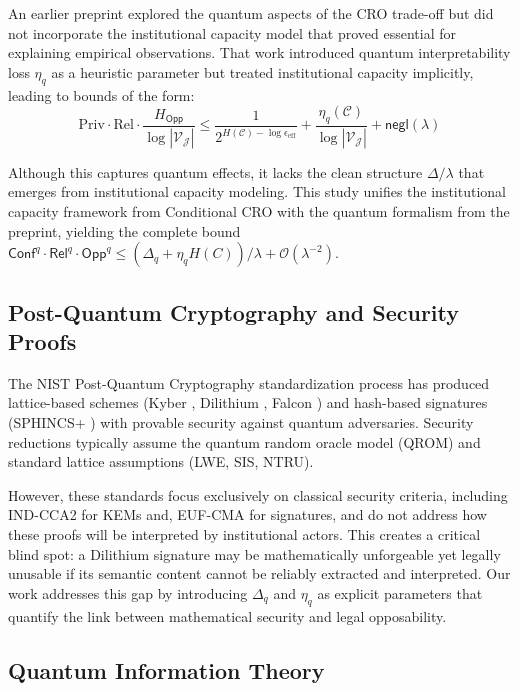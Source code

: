 \documentclass{ieeeaccess}
\newcommand{\Conf}{\mathsf{Conf}}
\newcommand{\Rel}{\mathsf{Rel}}
\newcommand{\Opp}{\mathsf{Opp}}
\begin{document}
An earlier preprint \cite{CRO2025} explored the quantum aspects of the CRO trade-off but did not incorporate the institutional capacity model that proved essential for explaining empirical observations. That work introduced quantum interpretability loss $\eta_q$ as a heuristic parameter but treated institutional capacity implicitly, leading to bounds of the form:
\begin{equation}
    \mathrm{Priv} \cdot \mathrm{Rel} \cdot \frac{H_{\mathsf{Opp}}}{\log|\mathcal{V}_{\mathcal{J}}|} \leq \frac{1}{2^{H(\mathcal{C})-\log \epsilon_{\text{eff}}}} + \frac{\eta_q(\mathcal{C})}{\log|\mathcal{V}_{\mathcal{J}}|} + \mathsf{negl}(\lambda)
\end{equation}

Although this captures quantum effects, it lacks the clean structure $\Delta/\lambda$ that emerges from institutional capacity modeling. This study unifies the institutional capacity framework from Conditional CRO \cite{Minka2026CRO} with the quantum formalism from the preprint, yielding the complete bound $\Conf^q \cdot \Rel^q \cdot \Opp^q \leq (\Delta_q + \eta_q H(C))/\lambda + \mathcal{O}(\lambda^{-2})$.

\subsection{Post-Quantum Cryptography and Security Proofs}

The NIST Post-Quantum Cryptography standardization process \cite{NISTPQC} has produced lattice-based schemes (Kyber \cite{Kyber2022}, Dilithium \cite{Dilithium2022}, Falcon \cite{Falcon2022}) and hash-based signatures (SPHINCS+ \cite{SPHINCS2022}) with provable security against quantum adversaries. Security reductions typically assume the quantum random oracle model (QROM) \cite{Boneh2011} and standard lattice assumptions (LWE, SIS, NTRU).

However, these standards focus exclusively on classical security criteria, including IND-CCA2 for KEMs and, EUF-CMA for signatures, and do not address how these proofs will be interpreted by institutional actors. This creates a critical blind spot: a Dilithium signature may be mathematically unforgeable yet legally unusable if its semantic content cannot be reliably extracted and interpreted. Our work addresses this gap by introducing $\Delta_q$ and $\eta_q$ as explicit parameters that quantify the link between mathematical security and legal opposability.

\subsection{Quantum Information Theory}
\end{document}

